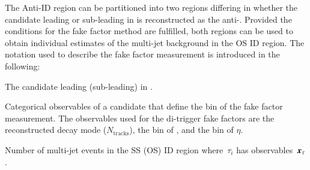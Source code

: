 {%
  \newcommand*{\ffargs}{\ensuremath{( \myvec{x}_{\tau} )}\xspace}

  \newcommand*{\NmjID}[2]{\ensuremath{N_\text{multi-jet}^{\text{#1, loose }\tau_{#2}}}\xspace}
  \newcommand*{\NmjIDIncl}[1]{\ensuremath{N_\text{multi-jet}^{\text{#1, ID}}}\xspace}

  \newcommand*{\NmjAntiIDIncl}[1]{\ensuremath{N_\text{multi-jet}^{\text{#1, Anti-ID}}}\xspace}
  \newcommand*{\NmjAntiID}[2]{\ensuremath{N_\text{multi-jet}^{\text{#1, anti-}\tau_{#2}}}\xspace}

  The Anti-ID region can be partitioned into two regions differing in
  whether the \tauhadvis candidate leading or sub-leading in \pT is
  reconstructed as the anti-\tauhadvis. Provided the conditions for
  the fake factor method are fulfilled, both regions can be used to
  obtain individual estimates of the multi-jet background in the OS ID
  region. The notation used to describe the fake factor measurement is
  introduced in the following:
  \begin{description}[style=standard]
  \item[$\tau_0$ ($\tau_1$)] The \tauhadvis candidate leading (sub-leading) in \pT.

  \item[$\myvec{x}_\tau$] Categorical observables of a \tauhadvis
    candidate that define the bin of the fake factor measurement. The
    observables used for the di-\tauhadvis trigger fake factors are
    the reconstructed decay mode ($N_\text{tracks}$), the bin of
    \tauhadvis \pT, and the bin of \tauhadvis $\eta$.

  \item[$\NmjID{SS(OS)}{i}\ffargs$] Number of multi-jet events in the
    SS (OS) ID region where~$\tau_i$ has
    observables~$\myvec{x}_\tau$. 


\end{description}}
